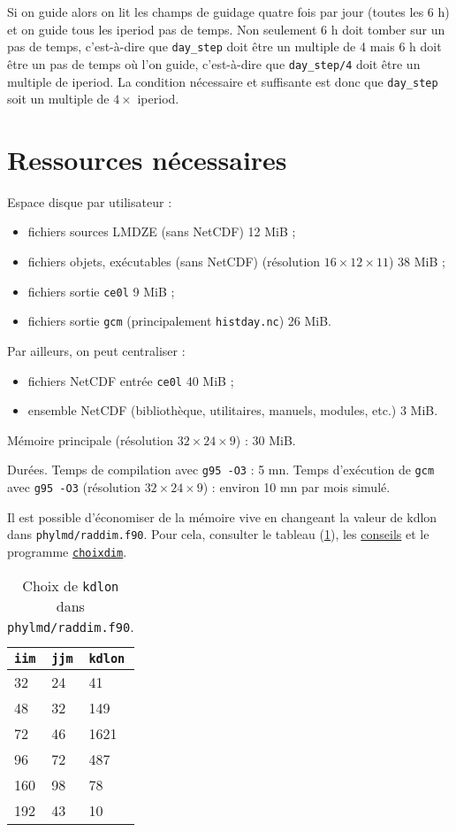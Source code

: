 \documentclass[a4paper,english,french]{article}
\begin{document}
Si on guide alors on lit les champs de guidage quatre fois par jour
(toutes les 6 h) et on guide tous les iperiod pas de temps. Non
seulement 6 h doit tomber sur un pas de temps, c'est-à-dire que
\verb+day_step+ doit être un multiple de 4 mais 6 h doit être un pas
de temps où l'on guide, c'est-à-dire que \verb+day_step/4+ doit être
un multiple de iperiod. La condition nécessaire et suffisante est donc
que \verb+day_step+ soit un multiple de $4 \times$ iperiod.

\section{Ressources nécessaires}

Espace disque par utilisateur :
\begin{itemize}
\item fichiers sources LMDZE (sans NetCDF) 12 MiB ;
\item fichiers objets, exécutables (sans NetCDF) (résolution
  $16 \times 12 \times 11$) 38 MiB ;
\item fichiers sortie \verb+ce0l+ 9 MiB ;
\item fichiers sortie \verb+gcm+ (principalement \verb+histday.nc+) 26
  MiB.
\end{itemize}
Par ailleurs, on peut centraliser :
\begin{itemize}
\item fichiers NetCDF entrée \verb+ce0l+ 40 MiB ;
\item ensemble NetCDF (bibliothèque, utilitaires, manuels, modules,
  etc.) 3 MiB.
\end{itemize}

Mémoire principale (résolution $32 \times 24 \times 9$) : 30 MiB.

Durées. Temps de compilation avec \verb+g95 -O3+ : 5 mn. Temps
d'exécution de \verb+gcm+ avec \verb+g95 -O3+ (résolution $32 \times
24 \times 9$) : environ 10 mn par mois simulé.

Il est possible d'économiser de la mémoire vive en changeant la valeur
de kdlon dans \verb+phylmd/raddim.f90+.  Pour cela, consulter le
tableau (\ref{tab:kdlon}), les
\href{http://www.lmd.jussieu.fr/~lmdz/LMDZ4/choisir_une_resolution.html}{conseils}
et le programme
\href{file:///user/guez/Documents/Informatique_fonctionnement/Tests/LMDZ/choixdim.f}{\texttt{choixdim}}.
\begin{table}[htbp]
  \centering
  \begin{tabular}{lll}
    \texttt{iim} & \texttt{jjm} & \texttt{kdlon} \\
    \hline
    32 & 24 & 41 \\
    48 & 32 & 149 \\
    72 & 46 & 1621 \\
    96 & 72 & 487 \\
    160 & 98 & 78 \\
    192 & 43 & 10
  \end{tabular}
  \caption{Choix de \texttt{kdlon} dans \texttt{phylmd/raddim.f90}.}
  \label{tab:kdlon}
\end{table}
\end{document}
